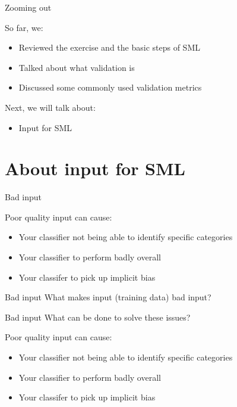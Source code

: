 \documentclass[compress]{beamer}
\begin{document}
\begin{frame}[fragile]{Zooming out} 
	
\begin{alertblock}{So far, we:}
\begin{itemize}
	\item Reviewed the exercise and the basic steps of SML
	\item Talked about what validation is
	\item Discussed some commonly used validation metrics
\end{itemize}
\end{alertblock}
	
\begin{alertblock}{Next, we will talk about:}
\begin{itemize}
	\item Input for SML
\end{itemize}
\end{alertblock}	
\end{frame}



\section{About input for SML}

\begin{frame}[fragile]{Bad input}
\begin{alertblock}{Poor quality input can cause:}
	\begin{itemize}
		\item Your classifier not being able to identify specific categories %
		\item Your classifier to perform badly overall %
		\item Your classifer to pick up implicit bias %
	\end{itemize}
\end{alertblock}
\end{frame}


\begin{frame}[fragile]{Bad input}
What makes input (training data) bad input?
\end{frame}


\begin{frame}[fragile]{Bad input}
What can be done to solve these issues?
\begin{alertblock}{Poor quality input can cause:}
	\begin{itemize}
		\item Your classifier not being able to identify specific categories %
		\item Your classifier to perform badly overall %
		\item Your classifer to pick up implicit bias %
	\end{itemize}
\end{alertblock}
\end{frame}
\end{document}
